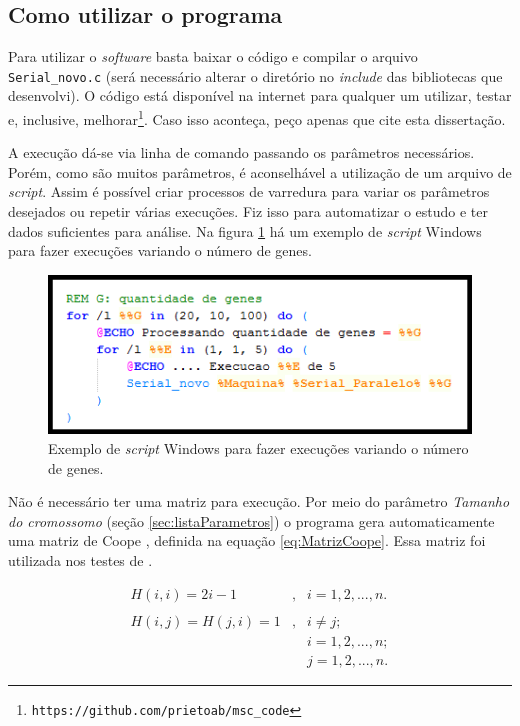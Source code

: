 \subsection{Como utilizar o programa}
	
	Para utilizar o \emph{software} basta baixar o código e compilar o arquivo \texttt{Serial\_novo.c} (será necessário alterar o diretório no \emph{include} das bibliotecas que desenvolvi). O código está disponível na internet para qualquer um utilizar, testar e, inclusive, melhorar\footnote{\texttt{https://github.com/prietoab/msc\_code}}. Caso isso aconteça, peço apenas que cite esta dissertação.
	
		A execução dá-se via linha de comando passando os parâmetros necessários. Porém, como são muitos parâmetros, é aconselhável a utilização de um arquivo de \emph{script}. Assim é possível criar processos de varredura para variar os parâmetros desejados ou repetir várias execuções. Fiz isso para automatizar o estudo e ter dados suficientes para análise. Na figura \ref{fig:script_windows} há um exemplo de \emph{script} Windows para fazer execuções variando o número de genes.
			
		\begin{figure}[htbp]
			\centering
				\includegraphics{figs/materiais_metodo/software/script_windows.png}
			\caption{Exemplo de \emph{script} Windows para fazer execuções variando o número de genes.}
			\label{fig:script_windows}
		\end{figure}

	Não é necessário ter uma matriz para execução. Por meio do parâmetro \emph{Tamanho do cromossomo} (seção \ref{sec:listaParametros}) o programa gera automaticamente uma matriz de Coope \cite{Coope1977}, definida na equação \ref{eq:MatrizCoope}. Essa matriz foi utilizada nos testes de \cite{metodo2011}.
	
	\begin{equation}\label{eq:MatrizCoope}
		\begin{array}{ccl}
			H(i,i) = 2i - 1 			& , & i = 1, 2, ..., n. \\
														&		&		\\
			H(i,j) = H(j,i) = 1		& , & i \neq j; \\
														&		& i = 1, 2, ..., n; \\
														&		& j = 1, 2, ..., n.
		\end{array}
	\end{equation}
	
